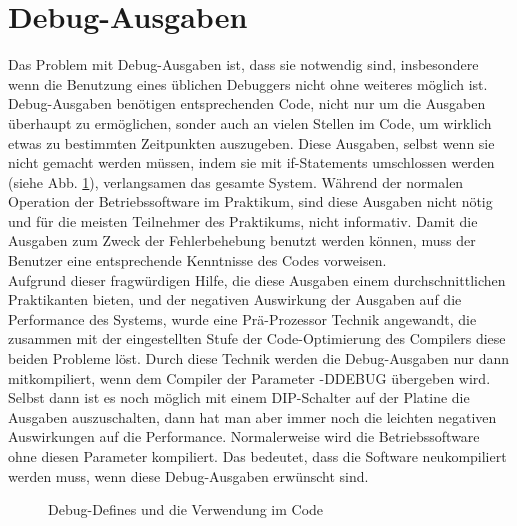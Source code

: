 \section{Debug-Ausgaben \label{impl_debug}}
Das Problem mit Debug-Ausgaben ist, dass sie notwendig sind, insbesondere wenn die Benutzung eines üblichen Debuggers nicht
ohne weiteres möglich ist. Debug-Ausgaben benötigen entsprechenden Code, nicht nur um die Ausgaben überhaupt zu ermöglichen,
sonder auch an vielen Stellen im Code, um wirklich etwas zu bestimmten Zeitpunkten auszugeben. Diese Ausgaben, selbst wenn
sie nicht gemacht werden müssen, indem sie mit if-Statements umschlossen werden (siehe Abb. \ref{debug_trick}), verlangsamen
das gesamte System. Während der normalen Operation der Betriebssoftware im Praktikum, sind diese Ausgaben nicht nötig und für
die meisten Teilnehmer des Praktikums, nicht informativ. Damit die Ausgaben zum Zweck der Fehlerbehebung benutzt werden können,
muss der Benutzer eine entsprechende Kenntnisse des Codes vorweisen.\\
Aufgrund dieser fragwürdigen Hilfe, die diese Ausgaben einem durchschnittlichen Praktikanten bieten, und der negativen Auswirkung
der Ausgaben auf die Performance des Systems, wurde eine Prä-Prozessor Technik angewandt, die zusammen mit der eingestellten Stufe
der Code-Optimierung des Compilers diese beiden Probleme löst. Durch diese Technik werden die Debug-Ausgaben nur dann mitkompiliert,
wenn dem Compiler der Parameter -DDEBUG übergeben wird. Selbst dann ist es noch möglich mit einem DIP-Schalter auf der Platine
die Ausgaben auszuschalten, dann hat man aber immer noch die leichten negativen Auswirkungen auf die Performance. Normalerweise
wird die Betriebssoftware ohne diesen Parameter kompiliert. Das bedeutet, dass die Software neukompiliert werden muss, wenn
diese Debug-Ausgaben erwünscht sind.
\begin{figure}[htb]
 \centering
 \caption{\label{debug_trick}Debug-Defines und die Verwendung im Code}
\end{figure}

